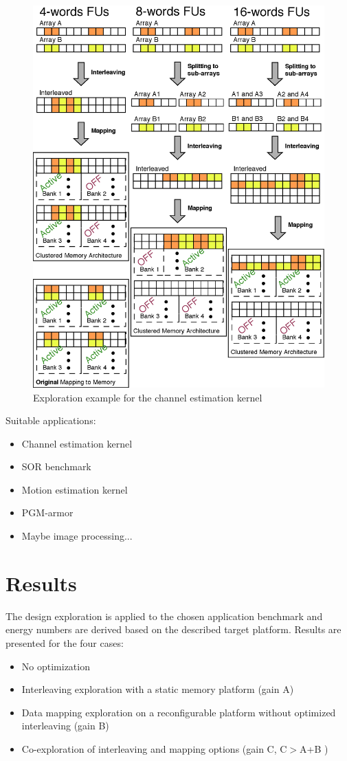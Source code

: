 \documentclass[runningheads,a4paper]{llncs}
\begin{document}
\begin{figure}
\centering
	\label{example}
	\caption{Exploration example for the channel estimation kernel}
	\includegraphics[width=\textwidth]{Images/Example.eps} 
\end{figure}

Suitable applications:
\begin{itemize}
\item Channel estimation kernel
\item SOR benchmark
\item Motion estimation kernel
\item PGM-armor
\item Maybe image processing...
\end{itemize}

\section{Results}

The design exploration is applied to the chosen application benchmark and energy numbers are derived based on the described target platform.
Results are presented for the four cases:
\begin{itemize}
\item No optimization
\item Interleaving exploration with a static memory platform (gain A)
\item Data mapping exploration on a reconfigurable platform without optimized interleaving (gain B)
\item Co-exploration of interleaving and mapping options (gain C, C$ > $A+B )
\end{itemize}
\end{document}
